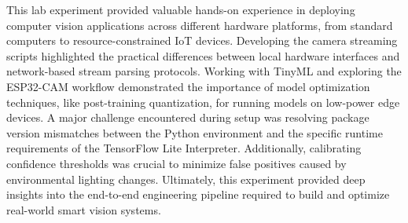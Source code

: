 \documentclass[12pt,a4paper]{article}
\begin{document}
This lab experiment provided valuable hands-on experience in deploying computer vision applications across different hardware platforms, from standard computers to resource-constrained IoT devices. Developing the camera streaming scripts highlighted the practical differences between local hardware interfaces and network-based stream parsing protocols. Working with TinyML and exploring the ESP32-CAM workflow demonstrated the importance of model optimization techniques, like post-training quantization, for running models on low-power edge devices. A major challenge encountered during setup was resolving package version mismatches between the Python environment and the specific runtime requirements of the TensorFlow Lite Interpreter. Additionally, calibrating confidence thresholds was crucial to minimize false positives caused by environmental lighting changes. Ultimately, this experiment provided deep insights into the end-to-end engineering pipeline required to build and optimize real-world smart vision systems.
\end{document}
